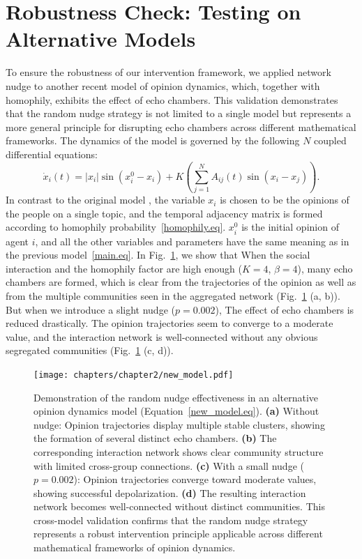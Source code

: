 \section{Robustness Check: Testing on Alternative Models}
To ensure the robustness of our intervention framework, we applied network nudge to another recent model \cite{modeling-explosive-opinion-depolarization-in-interdependent-topics} of opinion dynamics, which, together with homophily, exhibits the effect of echo chambers. This validation demonstrates that the random nudge strategy is not limited to a single model but represents a more general principle for disrupting echo chambers across different mathematical frameworks. The dynamics of the model is governed by the following $N$ coupled differential equations:
\begin{equation}
    \label{new_model.eq}
    \dot{x}_i(t)= |x_i|\sin{(x_i^0- x_i)} + K \left(\sum^{N}_{j=1} A_{ij} (t)  \sin{(x_i - x_j)}\right).
\end{equation}
In contrast to the original model \cite{modeling-explosive-opinion-depolarization-in-interdependent-topics}, the variable $x_i$ is chosen to be the opinions of the people on a single topic, and the temporal adjacency matrix is formed according to homophily probability~\eqref{homophily.eq}. $x_i^0$ is the initial opinion of agent $i$, and all the other variables and parameters have the same meaning as in the previous model~\eqref{main.eq}. In Fig.~\ref{fig:new_model}, we show that When the social interaction and the homophily factor are high enough ($K = 4$, $\beta = 4$), many echo chambers are formed, which is clear from the trajectories of the opinion as well as from the multiple communities seen in the aggregated network (Fig.~\ref{fig:new_model} (a, b)). But when we introduce a slight nudge ($p = 0.002$), The effect of echo chambers is reduced drastically. The opinion trajectories seem to converge to a moderate value, and the interaction network is well-connected without any obvious segregated communities (Fig.~\ref{fig:new_model} (c, d)).
\begin{figure}[H]
    \centering
    \texttt{[image: chapters/chapter2/new\_model.pdf]}
    \caption{Demonstration of the random nudge effectiveness in an alternative opinion dynamics model (Equation~\eqref{new_model.eq}). \textbf{(a)} Without nudge: Opinion trajectories display multiple stable clusters, showing the formation of several distinct echo chambers. \textbf{(b)} The corresponding interaction network shows clear community structure with limited cross-group connections. \textbf{(c)} With a small nudge ($p=0.002$): Opinion trajectories converge toward moderate values, showing successful depolarization. \textbf{(d)} The resulting interaction network becomes well-connected without distinct communities. This cross-model validation confirms that the random nudge strategy represents a robust intervention principle applicable across different mathematical frameworks of opinion dynamics.}
    \label{fig:new_model}
\end{figure}
